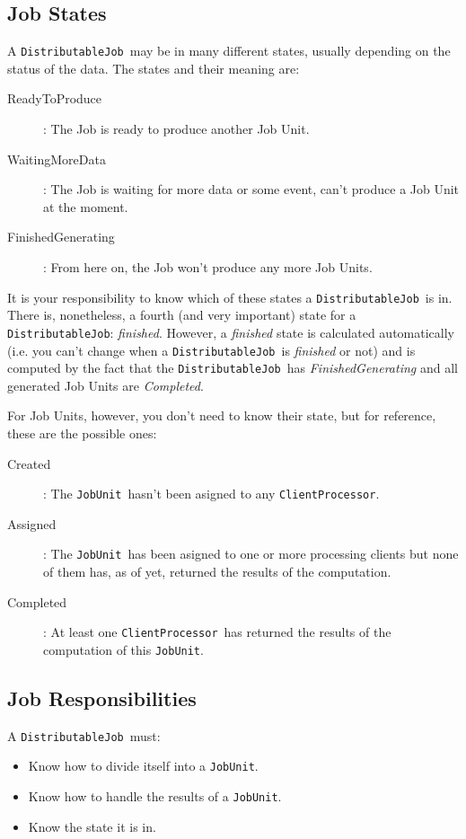 \documentclass[a4paper,12pt,english]{article}
\renewcommand{\DJ}{\texttt{DistributableJob}}
\newcommand{\JU}{\texttt{JobUnit}}
\newcommand{\CP}{\texttt{ClientProcessor}}
\begin{document}
\subsection{Job States}

A \DJ \ may be in many different states, usually depending on the status of the data. The states and their meaning are:
\begin{description}
\item[ReadyToProduce]: The Job is ready to produce another Job Unit.
\item[WaitingMoreData]: The Job is waiting for more data or some event, can't produce a Job Unit at the moment.
\item[FinishedGenerating]: From here on, the Job won't produce any more Job Units.
\end{description}

It is your responsibility to know which of these states a \DJ \ is in. There is, nonetheless, a fourth (and very important) state for a \DJ: \emph{finished}. However, a \emph{finished} state is calculated automatically (i.e. you can't change when a \DJ \ is \emph{finished} or not) and is computed by the fact that the \DJ \ has \emph{FinishedGenerating} and all generated Job Units are \emph{Completed}. 

For Job Units, however, you don't need to know their state, but for reference, these are the possible ones:
\begin{description}
\item[Created]: The \JU \ hasn't been asigned to any \CP.
\item[Assigned]: The \JU \ has been asigned to one or more processing clients but none of them has, as of yet, returned the results of the computation.
\item[Completed]: At least one \CP \ has returned the results of the computation of this \JU.
\end{description}


\subsection{Job Responsibilities}

A \DJ \ must:
\begin{itemize}
 \item Know how to divide itself into a \JU.
 \item Know how to handle the results of a \JU.
 \item Know the state it is in.
\end{itemize}
\end{document}
